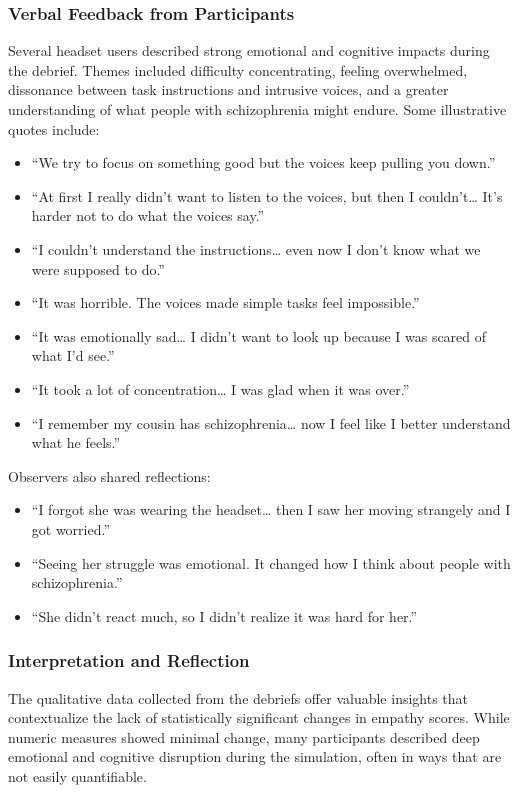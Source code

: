 \subsubsection{Verbal Feedback from Participants}

Several headset users described strong emotional and cognitive impacts during the debrief. Themes included difficulty concentrating, feeling overwhelmed, dissonance between task instructions and intrusive voices, and a greater understanding of what people with schizophrenia might endure. Some illustrative quotes include:

\begin{itemize}
  \item “We try to focus on something good but the voices keep pulling you down.”
  \item “At first I really didn't want to listen to the voices, but then I couldn't… It's harder not to do what the voices say.”
  \item “I couldn’t understand the instructions… even now I don’t know what we were supposed to do.”
  \item “It was horrible. The voices made simple tasks feel impossible.”
  \item “It was emotionally sad… I didn’t want to look up because I was scared of what I’d see.”
  \item “It took a lot of concentration… I was glad when it was over.”
  \item “I remember my cousin has schizophrenia… now I feel like I better understand what he feels.”
\end{itemize}

Observers also shared reflections:

\begin{itemize}
  \item “I forgot she was wearing the headset… then I saw her moving strangely and I got worried.”
  \item “Seeing her struggle was emotional. It changed how I think about people with schizophrenia.”
  \item “She didn’t react much, so I didn’t realize it was hard for her.”
\end{itemize}

\subsubsection{Interpretation and Reflection}

The qualitative data collected from the debriefs offer valuable insights that contextualize the lack of statistically significant changes in empathy scores. While numeric measures showed minimal change, many participants described deep emotional and cognitive disruption during the simulation, often in ways that are not easily quantifiable.

